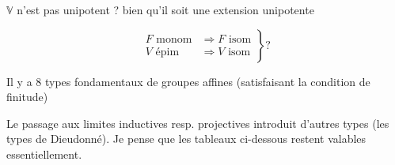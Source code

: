 $\mathbb V$ n'est pas unipotent ? bien qu'il soit une extension unipotente

\[
\left.\begin{aligned}
F\text{ monom}&\Longrightarrow F\text{ isom}\\
V\text{ épim}&\Longrightarrow V\text{ isom}
\end{aligned}\right\}?
\]

Il y a 8 types fondamentaux de groupes affines (satisfaisant la condition de finitude)

Le passage aux limites inductives resp. projectives introduit d'autres types  (les types de Dieudonné). Je pense que les tableaux ci-dessous restent valables essentiellement.

\diagram{\begin{tikzcd}[ampersand replacement=\&,column sep=5em]
{}\arrow[r,leftrightarrow]\&{}
\end{tikzcd}}
